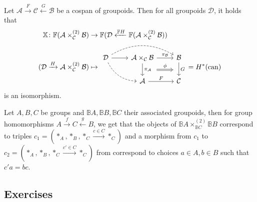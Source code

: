 \begin{prop}
	Let $ \mathcal{ A } \xrightarrow{ F } \mathcal{ C } \xleftarrow{ G } \mathcal{ B } $ be a cospan of groupoids.
	Then for all groupoids $ \mathcal{ D } $, it holds that 
	\begin{align*}
		\mathbb{ X } \colon \mathbb{ F } ( \mathcal{ A } \times^{ ( 2 ) }_{ \mathcal{ C } }\mathcal {B })
		&\to
		\mathbb{ F } ( \mathcal{ D } \xleftarrow{ \mathbb{ F } H } \mathbb{ F } ( \mathcal{ A } \times_{ \mathcal{ C } }^{ ( 2 ) }  \mathcal{ B } ) )		
		\\
		( \mathcal{ D } \xrightarrow{ H } \mathcal{ A } \times_{ \mathcal{ C } }^{ ( 2 ) } \mathcal{ B } ) 
		&\mapsto
		\begin{tikzcd}
			[ampersand replacement=\&]
			\mathcal{ D }
			\ar[r]
			\ar[rr, dashed, bend left]
			\ar[rd, dashed , bend right]
			\&
			\mathcal{ A } \times_{ \mathcal{ C } } \mathcal{ B } 
			\ar[r, " \pi_{ \mathcal{ B } } "]
			\ar[d, " \pi_{ \mathcal{ A } } "]
			\ar[ r , Rightarrow, shift right=7, " \phi"]
			\&
			\mathcal{ B } 
			\ar[d, " G "]
			\\
			\&
			\mathcal{ A } 
			\ar[r, " F "]
			\&
			\mathcal{ C }
		\end{tikzcd}
		=
		H^*( \can )
	\end{align*}
	is an isomorphism. 
\end{prop}

\begin{exmp}
	Let $ A , B , C $ be groups and $ \mathbb{B} A , \mathbb{B} B , \mathbb{B} C $ their associated groupoids, then for group homomorphisms $ A \xrightarrow { f } C  \xleftarrow { g } B $,
	we get that the objects of $ \mathbb{ B } A \times^{ ( 2 ) }_{ \mathbb{ B } C }  \mathbb{ B } B $ correspond to triples $ c_1 = ( *_A , *_B , *_C \xrightarrow{ c \in C } *_C ) $ and a morphism from $ c_1 $ to $ c_2 = ( *_A , *_B , *_C \xrightarrow{ c' \in C } *_C ) $ from correspond to choices $ a \in A , b \in B $ such that $ c' a = b c $.
\end{exmp}

\subsection{Exercises}

